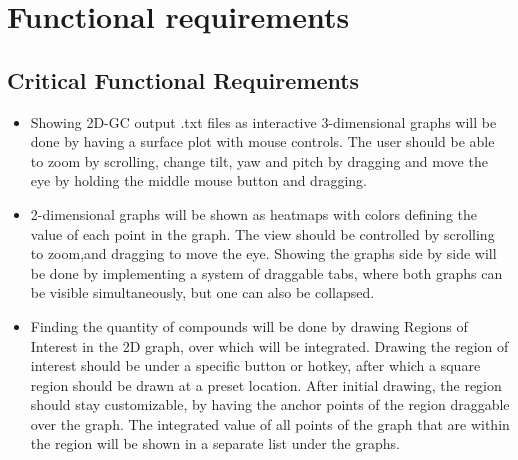 \documentclass{article}
\begin{document}
\section{Functional requirements}
\subsection*{Critical Functional Requirements}
\begin{itemize}
	\item Showing 2D-GC output .txt files as interactive 3-dimensional graphs will be done by having a surface plot with mouse controls. The user should be able to zoom by scrolling, change tilt, yaw and pitch by dragging and move the eye by holding the middle mouse button and dragging. 
	\item 2-dimensional graphs will be shown as heatmaps with colors defining the value of each point in the graph. The view should be controlled by scrolling to zoom,and dragging to move the eye. Showing the graphs side by side will be done by implementing a system of draggable tabs, where both graphs can be visible simultaneously, but one can also be collapsed.
    \item Finding the quantity of compounds will be done by drawing Regions of Interest in the 2D graph, over which will be integrated. Drawing the region of interest should be under a specific button or hotkey, after which a square region should be drawn at a preset location. After initial drawing, the region should stay customizable, by having the anchor points of the region draggable over the graph. The integrated value of all points of the graph that are within the region will be shown in a separate list under the graphs. 
\end{itemize}
\end{document}

